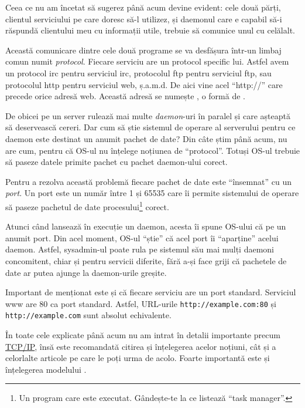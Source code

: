 Ceea ce nu am încetat să sugerez până acum devine evident: cele două părți, clientul
serviciului pe care doresc să-l utilizez, și daemonul care e capabil să-i răspundă
clientului meu cu informații utile, trebuie să comunice unul cu celălalt.

Această comunicare dintre cele două programe se va desfășura într-un limbaj comun numit
\textsl{protocol}. Fiecare serviciu are un protocol specific lui. Astfel avem un
protocol irc pentru serviciul irc, protocolul ftp pentru serviciul ftp,
sau protocolul http pentru serviciul web, ș.a.m.d. De aici vine acel ``http://'' care precede
orice adresă web. Această adresă se numește
,
o formă de .

De obicei pe un server rulează mai multe \textit{daemon}-uri în paralel și care
așteaptă să deservească cereri. Dar cum să știe sistemul de operare al serverului
pentru ce daemon este destinat un anumit pachet de date? Din câte știm până acum,
nu are cum, pentru că OS-ul nu înțelege noțiunea de ``protocol''. Totuși OS-ul trebuie
să paseze datele primite pachet cu pachet daemon-ului corect.

Pentru a rezolva această problemă fiecare pachet de date este ``însemnat'' cu un \textsl{port}.
Un port este un număr între 1 și 65535 care îi permite sistemului de operare să
paseze pachetul de date procesului\footnote{Un program care este executat. Gândește-te
la ce listează ``task manager''.} corect.

Atunci când  lansează în execuție un daemon,
acesta îi spune OS-ului că 
pe un anumit port. Din acel moment, OS-ul
``știe'' că acel port îi ``aparține'' acelui daemon. Astfel, sysadmin-ul poate rula
pe sistemul său mai mulți daemoni concomitent, chiar și pentru servicii diferite, fără
a-și face griji că pachetele de date ar putea ajunge la daemon-urile greșite.

Important de menționat este și că fiecare serviciu are un port standard. Serviciul www
are 80 ca port standard. Astfel, URL-urile \texttt{http://example.com:80} și
\texttt{http://example.com} sunt absolut echivalente.

În toate cele explicate până acum nu am intrat în detalii importante precum
\href{http://en.wikipedia.org/wiki/Internet_Protocol_Suite}{TCP/IP}, însă este recomandată citirea și
înțelegerea acelor noțiuni, cât și a celorlalte articole pe care le poți urma de acolo.
Foarte importantă este și înțelegerea modelului
.

